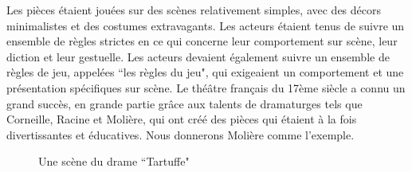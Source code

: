 \documentclass[UTF8,a4paper,12pt]{ctexart}
\numberwithin{equation}{section}
\newcommand{\mycite}[1]{\cite{#1}}
\begin{document}
Les pièces étaient jouées sur des scènes relativement simples, avec des décors minimalistes et des costumes extravagants. Les acteurs étaient tenus de suivre un ensemble de règles strictes en ce qui concerne leur comportement sur scène, leur diction et leur gestuelle. Les acteurs devaient également suivre un ensemble de règles de jeu, appelées ``les règles du jeu", qui exigeaient un comportement et une présentation spécifiques sur scène\mycite{forestier1996theatre}.
Le théâtre français du 17ème siècle a connu un grand succès, en grande partie grâce aux talents de dramaturges tels que Corneille, Racine et Molière, qui ont créé des pièces qui étaient à la fois divertissantes et éducatives. Nous donnerons Molière comme l'exemple.
\begin{figure}[H] 
\caption{Une scène du drame ``Tartuffe"}
\end{figure}
\end{document}
